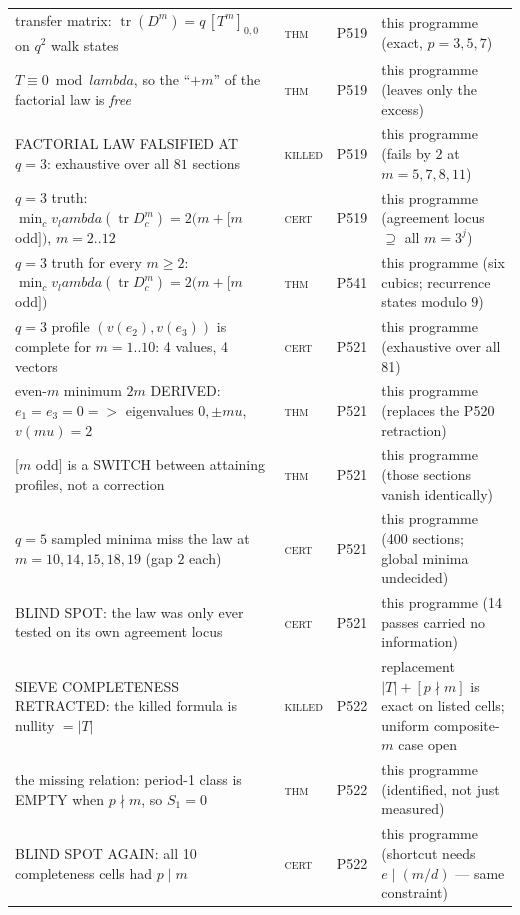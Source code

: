 \documentclass[12pt,a4paper]{article}
\def\textbf#1{#1}%
\def\lambda{lambda}%
\def\mu{mu}%
\def\Rightarrow{ => }%
\theoremstyle{definition}
\begin{document}
\begin{center}
\begin{tabular}{@{}p{}llp{}@{}}
transfer matrix: $\operatorname{tr}(D^m)=q\,[T^m]_{0,0}$ on $q^2$ walk states & \textsc{thm} & P519 & this programme (exact, $p{=}3,5,7$) \\
$T\equiv0\bmod\lambda$, so the ``$+m$'' of the factorial law is \emph{free} & \textsc{thm} & P519 & this programme (leaves only the excess) \\
\textbf{FACTORIAL LAW FALSIFIED AT $q{=}3$}: exhaustive over all $81$ sections & \textsc{killed} & P519 & this programme (fails by $2$ at $m{=}5,7,8,11$) \\
$q{=}3$ truth: $\min_c v_\lambda(\operatorname{tr}D_c^m)=2(m{+}[m$ odd$])$, $m{=}2..12$ & \textsc{cert} & P519 & this programme (agreement locus $\supseteq$ all $m{=}3^j$) \\
\textbf{$q{=}3$ truth for every $m\ge2$}: $\min_c v_\lambda(\operatorname{tr}D_c^m)=2(m{+}[m$ odd$])$ & \textsc{thm} & P541 & this programme (six cubics; recurrence states modulo $9$) \\
$q{=}3$ profile $(v(e_2),v(e_3))$ is complete for $m{=}1..10$: 4 values, 4 vectors & \textsc{cert} & P521 & this programme (exhaustive over all 81) \\
even-$m$ minimum $2m$ DERIVED: $e_1{=}e_3{=}0\Rightarrow$ eigenvalues $0,\pm\mu$, $v(\mu){=}2$ & \textsc{thm} & P521 & this programme (replaces the P520 retraction) \\
$[m$ odd$]$ is a SWITCH between attaining profiles, not a correction & \textsc{thm} & P521 & this programme (those sections vanish identically) \\
$q{=}5$ sampled minima miss the law at $m{=}10,14,15,18,19$ (gap $2$ each) & \textsc{cert} & P521 & this programme (400 sections; global minima undecided) \\
BLIND SPOT: the law was only ever tested on its own agreement locus & \textsc{cert} & P521 & this programme (14 passes carried no information) \\
\textbf{SIEVE COMPLETENESS RETRACTED}: the killed formula is nullity $=\lvert T\rvert$ & \textsc{killed} & P522 & replacement $\lvert T\rvert+[p\nmid m]$ is exact on listed cells; uniform composite-$m$ case open \\
the missing relation: period-1 class is EMPTY when $p\nmid m$, so $S_1{=}0$ & \textsc{thm} & P522 & this programme (identified, not just measured) \\
BLIND SPOT AGAIN: all 10 completeness cells had $p\mid m$ & \textsc{cert} & P522 & this programme (shortcut needs $e\mid(m/d)$ --- same constraint) \\

\end{tabular}
\end{center}
\end{document}
